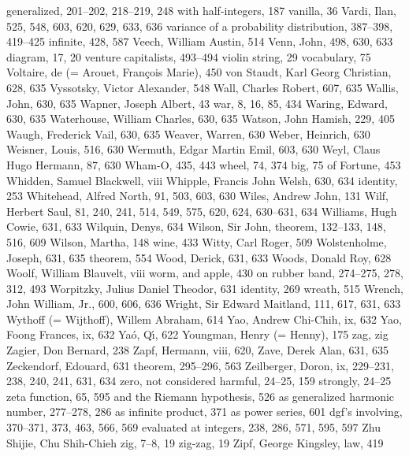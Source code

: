 \sub generalized, 201--202, 218--219, 248
\sub with half-integers, 187
vanilla, 36
Vardi, Ilan, 525, 548, 603, 620, 629, 633, 636
variance of a probability distribution, 387--398, 419--425
\sub infinite, 428, 587
Veech, William Austin, 514
Venn, John, 498, 630, 633
\sub diagram, 17, 20
venture capitalists, 493--494
violin string, 29
vocabulary, 75
Voltaire, de (= Arouet, Fran\c{c}ois Marie), 450
von Staudt, Karl Georg Christian, 628, 635
Vyssotsky, Victor Alexander, 548
\medskip
Wall, Charles Robert, 607, 635
Wallis, John, 630, 635
Wapner, Joseph Albert, 43
war, 8, 16, 85, 434
Waring, Edward, 630, 635
Waterhouse, William Charles, 630, 635
Watson, John Hamish, 229, 405
Waugh, Frederick Vail, 630, 635
Weaver, Warren, 630
Weber, Heinrich, 630
Weisner, Louis, 516, 630
Wermuth, Edgar Martin Emil, 603, 630
Weyl, Claus Hugo Hermann, 87, 630
Wham-O, 435, 443
wheel, 74, 374
\sub big, 75
\sub of Fortune, 453
Whidden, Samuel Blackwell, viii
Whipple, Francis John Welsh, 630, 634
\sub identity, 253
Whitehead, Alfred North, 91, 503, 603, 630
Wiles, Andrew John, 131
Wilf, Herbert Saul, 81, 240, 241, 514, 549, 575, 620, 624, 630--631, 634
Williams, Hugh Cowie, 631, 633
Wilquin, Denys, 634
Wilson, Sir John, theorem, 132--133, 148, 516, 609
Wilson, Martha, 148
wine, 433
Witty, Carl Roger, 509
Wolstenholme, Joseph, 631, 635
\sub theorem, 554
Wood, Derick, 631, 633
Woods, Donald Roy, 628
Woolf, William Blauvelt, viii
worm,
\sub and apple, 430
\sub on rubber band, 274--275, 278, 312, 493
Worpitzky, Julius Daniel Theodor, 631
\sub identity, 269
wreath, 515
Wrench, John William, Jr., 600, 606, 636
Wright, Sir Edward Maitland, 111, 617, 631, 633
Wythoff (= Wijthoff), Willem Abraham, 614
\medskip
Yao, Andrew Chi-Chih, ix, 632
Yao, Foong Frances, ix, 632
Ya\'o, Q\'{\i}, 622
Youngman, Henry (= Henny), 175
\medskip
zag, \see zig
Zagier, Don Bernard, 238
Zapf, Hermann, viii, 620, \cpage
Zave, Derek Alan, 631, 635
Zeckendorf, Edouard, 631
\sub theorem, 295--296, 563
Zeilberger, Doron, ix, 229--231, 238, 240, 241, 631, 634
zero, not considered harmful, 24--25, 159
\sub strongly, 24--25
zeta function, 65, 595
\sub and the Riemann hypothesis, 526
\sub as generalized harmonic number, 277--278, 286
\sub as infinite product, 371
\sub as power series, 601
\sub dgf's involving, 370--371, 373, 463, 566, 569
\sub evaluated at integers, 238, 286, 571, 595, 597
Zhu Shijie, \see Chu Shih-Chieh
zig, 7--8, 19
zig-zag, 19
Zipf, George Kingsley, law, 419
\eject %
\bye
